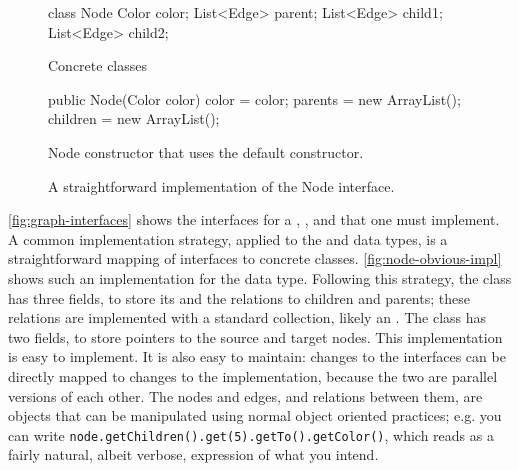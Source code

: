 \begin{figure}
\centering
\begin{subfloat}
\begin{minipage}[b]{0.44\textwidth}
\begin{shortlisting}
class Node {
   Color color;
   List<Edge> parent;
   List<Edge> child1;
   List<Edge> child2;
}
\end{shortlisting}
\end{minipage}
\caption{Concrete classes}
\end{subfloat}
\begin{subfloat}
\begin{minipage}[b]{0.568\textwidth}
\begin{shortlisting}
public Node(Color color) {
   color = color;
   parents = new ArrayList();
   children = new ArrayList();
}
\end{shortlisting}
\end{minipage}
\caption{Node constructor that uses the default  constructor.}
\label{fig:node-obvious-constructor}
\end{subfloat}
\caption{A straightforward implementation of the Node interface.}
\label{fig:node-obvious-impl}
\end{figure}

\autoref{fig:graph-interfaces} shows the interfaces for a ,
, and  that one must implement. A common implementation
strategy, applied to the  and  data types, is a
straightforward mapping of interfaces to concrete classes.
\autoref{fig:node-obvious-impl} shows such an implementation for the
 data type. Following this
strategy, the  class has three fields, to store its 
and the relations to children and parents; these relations are implemented with a
standard collection, likely an . The  class has two
fields, to store pointers to the source and target nodes. This implementation is
easy to implement. It is also easy to maintain: changes to the interfaces can be
directly mapped to changes to the implementation, because the two are parallel
versions of each other. The nodes and edges, and relations between them, are
objects that can be manipulated using normal object oriented practices; e.g. you
can write \texttt{node.getChildren().get(5).getTo()\-.getColor()}, which reads
as a fairly natural, albeit verbose, expression of what you intend.

